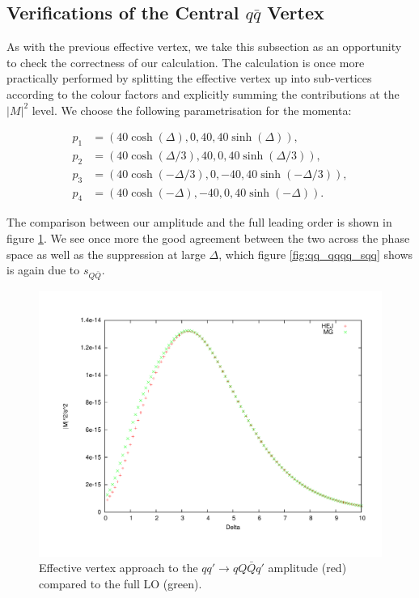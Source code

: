 \subsection{Verifications of the Central $q\bar{q}$ Vertex}

As with the previous effective vertex, we take this subsection as an opportunity to check the correctness of our calculation. The calculation is once more practically performed by splitting the effective vertex up into sub-vertices according to the colour factors and explicitly summing the contributions at the $|M|^2$ level. We choose the following parametrisation for the momenta: 

\begin{equation}
\begin{split}
p_1 & = (40 \cosh(\Delta), 0, 40, 40 \sinh(\Delta)), \\
p_2 & = (40 \cosh(\Delta/3), 40, 0, 40 \sinh(\Delta/3)), \\
p_3 & = (40 \cosh(-\Delta/3), 0, -40, 40 \sinh(-\Delta/3)), \\
p_4 & = (40 \cosh(-\Delta), -40, 0, 40 \sinh(-\Delta)). 
\end{split}
\label{eqn:4jetmom}
\end{equation}

The comparison between our amplitude and the full leading order is shown in figure \ref{fig:qq_qqqq}. We see once more the good agreement between the two across the phase space as well as the suppression at large $\Delta$, which figure \ref{fig:qq_qqqq_sqq} shows is again due to $s_{Q \bar{Q}}$. 

\begin{figure}[H]
\centering
\includegraphics[scale=0.45]{Images/qQ_qqqxQ.pdf}
\caption{Effective vertex approach to the $qq' \to qQ\bar{Q}q'$ amplitude (red) compared to the full LO (green).}
\label{fig:qq_qqqq}
\end{figure}

